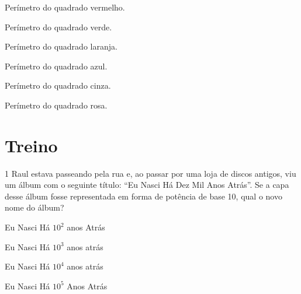 \begin{escolha}[itemsep=0pt]
\item Perímetro do quadrado vermelho.
\item Perímetro do quadrado verde.
\item Perímetro do quadrado laranja.
\item Perímetro do quadrado azul.
\item Perímetro do quadrado cinza.
\item Perímetro do quadrado rosa.
\end{escolha}


\pagebreak

\section{Treino}

\num{1} Raul estava passeando pela rua e, ao passar por uma loja de discos
antigos, viu um álbum com o seguinte título: ``Eu Nasci Há Dez Mil Anos
Atrás''. Se a capa desse álbum fosse representada em forma de potência
de base 10, qual o novo nome do álbum?

\begin{escolha}[itemsep=0pt]
\item Eu Nasci Há $10^2$ anos Atrás
\item Eu Nasci Há $10^3$ anos atrás
\item Eu Nasci Há $10^4$ anos atrás
\item Eu Nasci Há $10^5$ Anos Atrás
\end{escolha}



